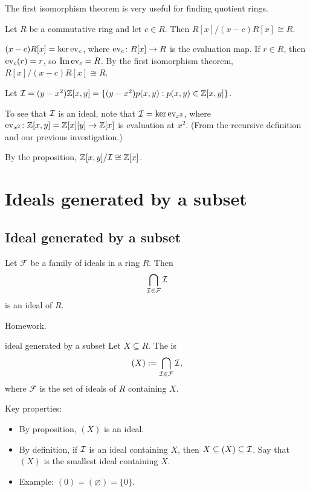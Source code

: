 \documentclass[12pt,letterpaper]{report}
\begin{document}
The first isomorphism theorem is very useful for finding quotient rings.

\begin{prop}{}{}
  Let $R$ be a commutative ring and let $c \in R$.
  Then $R[x]/(x - c)R[x] \cong R$.
\end{prop}

\begin{thmproof}
  $(x - c)R[x] = \ker\operatorname{ev}_c$, where $\operatorname{ev}_c \colon R[x] \to R$ is the evaluation map.
  If $r \in R$, then $\operatorname{ev}_c(r) = r$, so $\operatorname{Im}\operatorname{ev}_c = R$.
  By the first isomorphism theorem, $R[x]/(x - c)R[x] \cong R$.
\end{thmproof}

\begin{ex}
  Let $\mathcal{I} = (y - x^2)\mathbb{Z}[x, y] = \{(y - x^2)p(x, y) : p(x, y) \in \mathbb{Z}[x, y]\}$.

  To see that $\mathcal{I}$ is an ideal, note that $\mathcal{I} = \ker\operatorname{ev}_{x^2}$, where
  $\operatorname{ev}_{x^2} \colon \mathbb{Z}[x, y] = \mathbb{Z}[x][y] \to \mathbb{Z}[x]$ is evaluation at $x^2$.
  (From the recursive definition and our previous investigation.)

  By the proposition, $\mathbb{Z}[x, y]/\mathcal{I} \cong \mathbb{Z}[x]$.
\end{ex}

\section{Ideals generated by a subset}

\subsection{Ideal generated by a subset}

\begin{prop}{}{}
  Let $\mathcal{F}$ be a family of ideals in a ring $R$.
  Then \[ \bigcap_{\mathcal{I} \in \mathcal{F}} \mathcal{I} \] is an ideal of $R$.
\end{prop}

\begin{thmproof}
  Homework.
\end{thmproof}

\begin{defn}{ideal generated by a subset}{}
  Let $X \subseteq R$.
  The  is
  \[ (X) := \bigcap_{\mathcal{I} \in \mathcal{F}} \mathcal{I}, \]
  where $\mathcal{F}$ is the set of ideals of $R$ containing $X$.
\end{defn}

Key properties:
\begin{itemize}
  \item By proposition, $(X)$ is an ideal.
  \item By definition, if $\mathcal{I}$ is an ideal containing $X$, then
    $X \subseteq (X) \subseteq \mathcal{I}$.
    Say that $(X)$ is the smallest ideal containing $X$.
  \item Example: $(0) = (\varnothing) = \{0\}$.
\end{itemize}
\end{document}

